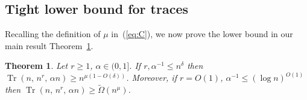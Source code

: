 \documentclass[11pt]{article}
\newtheorem{theo}{Theorem}[section]
\renewcommand{\a}{\alpha}
\renewcommand{\d}{\delta}
\newcommand{\C}{\mu}
\DeclareMathOperator{\trace}{Tr}
\begin{document}
	
%

\subsection{Tight lower bound for traces}\label{sec:traces}

Recalling the definition of $\C$ in~(\ref{eq:C}), we now prove the lower bound in our main result Theorem~\ref{th:main}.

\begin{theo} 
	\label{th:main}
	Let $r \ge 1$, $\a \in (0,1]$. If $r, \a^{-1} \le n^{\d}$ then
	$\trace(n,\,n^r,\,\a n) \ge n^{\C(1-O(\d))}$.
	Moreover, if $r=O(1)$, $\a^{-1} \le (\log n)^{O(1)}$ then $\trace(n,\,n^r,\,\a n) \ge \tilde\Omega(n^\C)$.
\end{theo}
\end{document}
